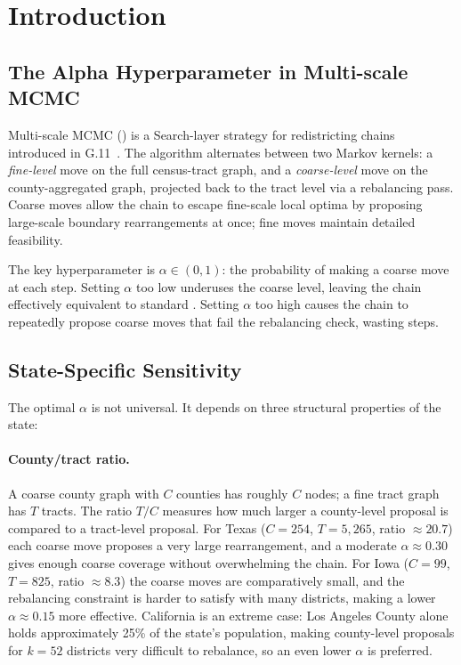\section{Introduction}
\label{sec:introduction}

\subsection{The Alpha Hyperparameter in Multi-scale MCMC}

Multi-scale MCMC (\ms{}) is a Search-layer strategy for redistricting
chains introduced in G.11~\citep{dellaLibera2026multiscale}.
The algorithm alternates between two Markov kernels: a \emph{fine-level}
\recom{} move on the full census-tract graph, and a \emph{coarse-level}
move on the county-aggregated graph, projected back to the tract level via
a rebalancing pass.
Coarse moves allow the chain to escape fine-scale local optima by proposing
large-scale boundary rearrangements at once; fine moves maintain detailed
feasibility.

The key hyperparameter is $\alpha \in (0,1)$: the probability of making a
coarse move at each step.
Setting $\alpha$ too low underuses the coarse level, leaving the chain
effectively equivalent to standard \recom{}.
Setting $\alpha$ too high causes the chain to repeatedly propose coarse moves
that fail the rebalancing check, wasting steps.

\subsection{State-Specific Sensitivity}

The optimal $\alpha$ is not universal.
It depends on three structural properties of the state:

\paragraph{County/tract ratio.}
A coarse county graph with $C$ counties has roughly $C$ nodes; a fine
tract graph has $T$ tracts.
The ratio $T/C$ measures how much larger a county-level proposal is compared
to a tract-level proposal.
For Texas ($C = 254$, $T = 5{,}265$, ratio $\approx 20.7$) each coarse move
proposes a very large rearrangement, and a moderate $\alpha \approx 0.30$
gives enough coarse coverage without overwhelming the chain.
For Iowa ($C = 99$, $T = 825$, ratio $\approx 8.3$) the coarse moves are
comparatively small, and the rebalancing constraint is harder to satisfy
with many districts, making a lower $\alpha \approx 0.15$ more effective.
California is an extreme case: Los Angeles County alone holds approximately
25\% of the state's population, making county-level proposals for $k = 52$
districts very difficult to rebalance, so an even lower $\alpha$ is preferred.

